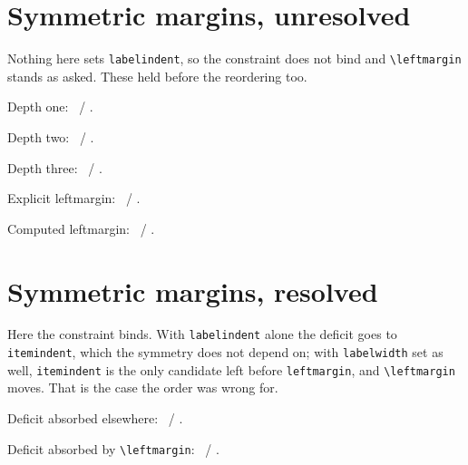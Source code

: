 \documentclass{article}
\newcommand\lr{\the\leftmargin\ / \the\rightmargin}
\begin{document}
\section{Symmetric margins, unresolved}

Nothing here sets \texttt{labelindent}, so the constraint does not bind and
\verb|\leftmargin| stands as asked.  These held before the reordering too.

\begin{prop}
  \item Depth one: \lr.
  \begin{prop}
    \item Depth two: \lr.
    \begin{prop}
      \item Depth three: \lr.
    \end{prop}
  \end{prop}
\end{prop}

\begin{prop}[leftmargin=5em]
  \item Explicit leftmargin: \lr.
\end{prop}

\begin{prop}[style=fitmargin]
  \item[A rather long proposition name] Computed leftmargin: \lr.
\end{prop}

\section{Symmetric margins, resolved}

Here the constraint binds.  With \texttt{labelindent} alone the deficit goes
to \texttt{itemindent}, which the symmetry does not depend on; with
\texttt{labelwidth} set as well, \texttt{itemindent} is the only candidate
left before \texttt{leftmargin}, and \verb|\leftmargin| moves.  That is the case
the order was wrong for.

\begin{prop}[labelindent=1em]
  \item Deficit absorbed elsewhere: \lr.
\end{prop}

\begin{prop}[labelindent=1em, labelwidth=2em]
  \item Deficit absorbed by \verb|\leftmargin|: \lr.
\end{prop}
\end{document}
